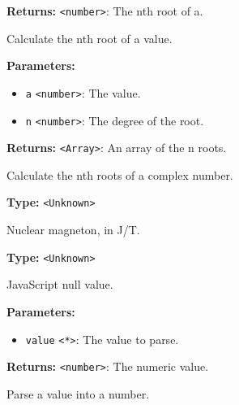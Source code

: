 \documentclass[12pt,a4paper]{article}
\begin{document}
\noindent \textbf{Returns:} \texttt{<number>}: The nth root of a.

\noindent Calculate the nth root of a value.

\vspace{5mm}
\noindent {}


\noindent \textbf{Parameters:}
\begin{itemize}
  \item \texttt{a} \texttt{<number>}: The value.
  \item \texttt{n} \texttt{<number>}: The degree of the root.
\end{itemize}

\noindent \textbf{Returns:} \texttt{<Array>}: An array of the n roots.

\noindent Calculate the nth roots of a complex number.

\vspace{5mm}
\noindent {}\vspace{4mm}


\noindent \textbf{Type:} \texttt{<Unknown>}

\noindent Nuclear magneton, in J/T.

\vspace{5mm}
\noindent {}\vspace{4mm}


\noindent \textbf{Type:} \texttt{<Unknown>}

\noindent JavaScript null value.

\vspace{5mm}
\noindent {}


\noindent \textbf{Parameters:}
\begin{itemize}
  \item \texttt{value} \texttt{<*>}: The value to parse.
\end{itemize}

\noindent \textbf{Returns:} \texttt{<number>}: The numeric value.

\noindent Parse a value into a number.
\end{document}
